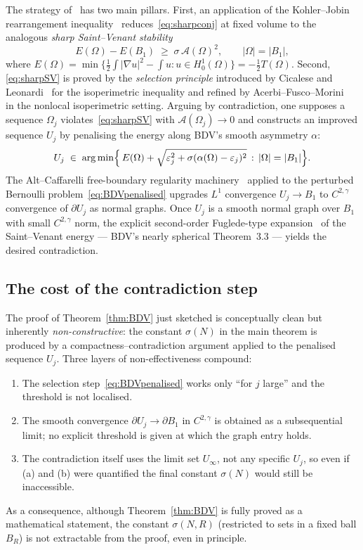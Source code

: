 \documentclass[11pt]{article}
\theoremstyle{definition}
\newcommand{\Fr}{\mathcal{A}}
\newcommand{\Om}{\Omega}
\newcommand{\eps}{\varepsilon}
\begin{document}
The strategy of~\cite{BDV} has two main pillars. First, an application
of the Kohler--Jobin rearrangement inequality~\cite{KohlerJobin,Brasco2014}
reduces~\eqref{eq:sharpconj} at fixed volume to the analogous
\emph{sharp Saint--Venant stability}
\begin{equation}\label{eq:sharpSV}
   E(\Om)-E(B_1)\;\ge\;\sigma\,\Fr(\Om)^2,\qquad |\Om|=|B_1|,
\end{equation}
where $E(\Om)=\min\{\tfrac12\int|\nabla u|^2-\int u:u\in H^1_0(\Om)\}=
-\tfrac12 T(\Om)$. Second, \eqref{eq:sharpSV} is proved by the
\emph{selection principle} introduced by Cicalese and
Leonardi~\cite{CL2012} for the isoperimetric inequality and refined by
Acerbi--Fusco--Morini~\cite{AFM} in the nonlocal isoperimetric
setting. Arguing by contradiction, one supposes a sequence $\Om_j$
violates~\eqref{eq:sharpSV} with $\Fr(\Om_j)\to0$ and constructs an
improved sequence $U_j$ by penalising the energy along BDV's smooth
asymmetry $\alpha$:
\begin{equation}\label{eq:BDVpenalised}
   U_j\;\in\;\arg\min\Bigl\{\,E(\Om)
      +\sqrt{\eps_j^2+\sigma(\alpha(\Om)-\eps_j)^2}\,:\,|\Om|=|B_1|\Bigr\}.
\end{equation}
The Alt--Caffarelli free-boundary regularity machinery~\cite{AC1981}
applied to the perturbed Bernoulli problem~\eqref{eq:BDVpenalised}
upgrades $L^1$ convergence $U_j\to B_1$ to $C^{2,\gamma}$ convergence
of $\partial U_j$ as normal graphs. Once $U_j$ is a smooth normal
graph over $B_1$ with small $C^{2,\gamma}$ norm, the explicit
second-order Fuglede-type expansion~\cite{Fuglede,BDV} of the
Saint--Venant energy --- BDV's nearly spherical Theorem~3.3 --- yields
the desired contradiction.

\subsection{The cost of the contradiction step}\label{ssec:cost}

The proof of Theorem~\ref{thm:BDV} just sketched is conceptually clean
but inherently \emph{non-constructive}: the constant $\sigma(N)$ in
the main theorem is produced by a compactness--contradiction argument
applied to the penalised sequence $U_j$. Three layers of
non-effectiveness compound:
\begin{enumerate}
\item[\rm(a)] The selection step~\eqref{eq:BDVpenalised} works only
``for $j$ large'' and the threshold is not localised.
\item[\rm(b)] The smooth convergence $\partial U_j\to\partial B_1$ in
$C^{2,\gamma}$ is obtained as a subsequential limit; no explicit
threshold is given at which the graph entry holds.
\item[\rm(c)] The contradiction itself uses the limit set $U_\infty$,
not any specific $U_j$, so even if (a) and (b) were quantified the
final constant $\sigma(N)$ would still be inaccessible.
\end{enumerate}
As a consequence, although Theorem~\ref{thm:BDV} is fully proved as a
mathematical statement, the constant $\sigma(N,R)$ (restricted to sets
in a fixed ball $B_R$) is not extractable from the proof, even in
principle.
\end{document}
